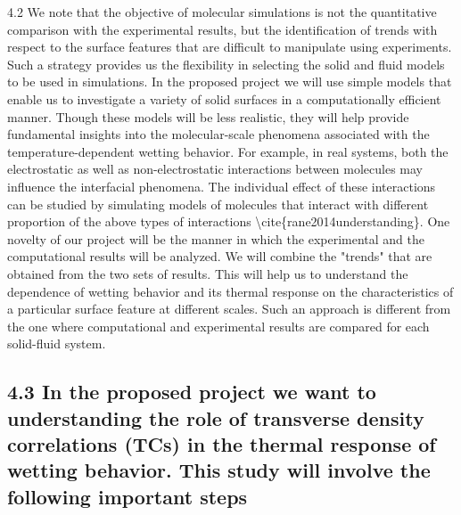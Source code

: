 \par 4.2 We note that the objective of molecular simulations is not the quantitative comparison with the experimental results, but the identification of trends with respect to the surface features that are difficult to manipulate using experiments. Such a strategy provides us the flexibility in selecting the solid and fluid models to be used in simulations. In the proposed project we will use simple models that enable us to investigate a variety of solid surfaces in a computationally efficient manner. Though these models will be less realistic, they will help provide fundamental insights into the molecular-scale phenomena associated with the temperature-dependent wetting behavior. For example, in real systems, both the electrostatic as well as non-electrostatic interactions between molecules may influence the interfacial phenomena. The individual effect of these interactions can be studied by simulating models of molecules that interact with different proportion of the above types of interactions \textbackslash cite\{rane2014understanding\}. One novelty of our project will be the manner in which the experimental and the computational results will be analyzed. We will combine the "trends" that are obtained from the two sets of results. This will help us to understand the dependence of wetting behavior and its thermal response on the characteristics of a particular surface feature at different scales. Such an approach is different from the one where computational and experimental results are compared for each solid-fluid system.\subsection{4.3 In the proposed project we want to understanding the role of transverse density correlations (TCs) in the thermal response of wetting behavior. This study will involve the following important steps}


